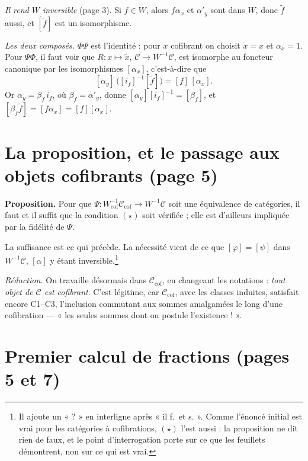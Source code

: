 \documentclass[11pt,a4paper]{article}
\begin{document}
\emph{Il rend $W$ inversible} (page 3). Si $f \in W$, alors $f\alpha_{x}$ et
$\alpha'_{y}$ sont dans $W$, donc $\widetilde{f}$ aussi, et $[\widetilde{f}]$
est un isomorphisme.

\emph{Les deux composés.} $\Phi\Psi$ est l'identité : pour $x$ cofibrant on
choisit $\widetilde{x} = x$ et $\alpha_{x} = 1$. Pour $\Psi\Phi$, il faut voir
que $R : x \mapsto \widetilde{x}$, $\mathcal{C} \to W^{-1}\mathcal{C}$, est
isomorphe au foncteur canonique par les isomorphismes $[\alpha_{x}]$,
c'est-à-dire que
\[
[\alpha_{y}]\,\bigl([i_{f}]^{-1}[\widetilde{f}]\bigr) = [f]\,[\alpha_{x}] .
\]
Or $\alpha_{y} = \beta_{f}\, i_{f}$, où $\beta_{f} = \alpha'_{y}$, donne
$[\alpha_{y}][i_{f}]^{-1} = [\beta_{f}]$, et $[\beta_{f}\widetilde{f}] =
[f\alpha_{x}] = [f][\alpha_{x}]$.

\section*{La proposition, et le passage aux objets cofibrants (page 5)}

\textbf{Proposition.} Pour que $\Psi :
W_{\mathrm{cof}}^{-1}\mathcal{C}_{\mathrm{cof}} \to W^{-1}\mathcal{C}$ soit une
équivalence de catégories, il faut et il suffit que la condition $(\star)$ soit
vérifiée ; elle est d'ailleurs impliquée par la fidélité de $\Psi$.

La suffisance est ce qui précède. La nécessité vient de ce que $[\varphi] =
[\psi]$ dans $W^{-1}\mathcal{C}$, $[\alpha]$ y étant inversible.\footnote{Il
ajoute un « ? » en interligne après « il f.\ et s. ». Comme l'énoncé
initial est vrai pour les catégories à cofibrations, $(\star)$ l'est aussi : la
proposition ne dit rien de faux, et le point d'interrogation porte sur ce que
les feuillets démontrent, non sur ce qui est vrai.}

\emph{Réduction.} On travaille désormais dans $\mathcal{C}_{\mathrm{cof}}$, en
changeant les notations : \emph{tout objet de $\mathcal{C}$ est cofibrant}.
C'est légitime, car $\mathcal{C}_{\mathrm{cof}}$, avec les classes induites,
satisfait encore C1--C3, l'inclusion commutant aux sommes amalgamées le long
d'une cofibration --- « les seules sommes dont on postule l'existence ! ».

\section*{Premier calcul de fractions (pages 5 et 7)}
\end{document}
